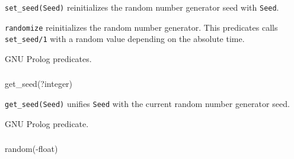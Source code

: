 \Description

\texttt{set\_seed(Seed)} reinitializes the random number generator seed with
\texttt{Seed}.

\texttt{randomize} reinitializes the random number generator. This
predicates calls \texttt{set\_seed/1} with a random value depending on the
absolute time.

\begin{PlErrors}




\end{PlErrors}

\Portability

GNU Prolog predicates.

\subsubsection{}

\begin{TemplatesOneCol}
get\_seed(?integer)

\end{TemplatesOneCol}

\Description

\texttt{get\_seed(Seed)} unifies \texttt{Seed} with the current random
number generator seed.

\begin{PlErrors}



\end{PlErrors}

\Portability

GNU Prolog predicate.

\subsubsection{}

\begin{TemplatesOneCol}
random(-float)

\end{TemplatesOneCol}


